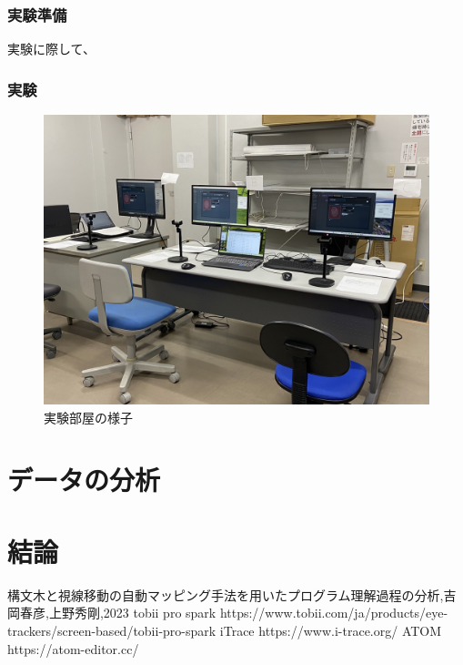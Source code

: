 \documentclass[paper=a4paper,fontsize=10pt]{jlreq}
\begin{document}
  \section{実験準備}
    実験に際して、

  \section{実験}

    \begin{figure}[htbp]
      \centering
      \includegraphics[width=0.8\linewidth]{実験部屋.jpg}
      \caption{実験部屋の様子}
    \end{figure}

\part{データの分析}


\part{結論}


\begin{thebibliography}{99}
   構文木と視線移動の自動マッピング手法を用いたプログラム理解過程の分析,吉岡春彦,上野秀剛,2023
   tobii pro spark https://www.tobii.com/ja/products/eye-trackers/screen-based/tobii-pro-spark
   iTrace https://www.i-trace.org/
   ATOM https://atom-editor.cc/
\end{thebibliography}
\end{document}
